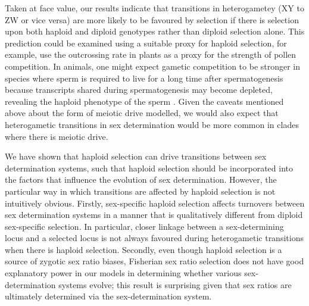 \documentclass[12pt]{article}
\begin{document}
Taken at face value, our results indicate that transitions in heterogametey (XY to ZW or vice versa) are more likely to be favoured by selection if there is selection upon both haploid and diploid genotypes rather than diploid selection alone. 
This prediction could be examined using a suitable proxy for haploid selection, for example, \cite{Lenormand:2005vb} use the outcrossing rate in plants as a proxy for the strength of pollen competition. 
In animals, one might expect gametic competition to be stronger in species where sperm is required to live for a long time after spermatogenesis because transcripts shared during spermatogenesis may become depleted, revealing the haploid phenotype of the sperm \citep{Immler:2014im}. 
Given the caveats mentioned above about the form of meiotic drive modelled, we would also expect that heterogametic transitions in sex determination would be more common in clades where there is meiotic drive. 

We have shown that haploid selection can drive transitions between sex determination systems, such that haploid selection should be incorporated into the factors that influence the evolution of sex determination. 
However, the particular way in which transitions are affected by haploid selection is not intuitively obvious. 
Firstly, sex-specific haploid selection affects turnovers between sex determination systems in a manner that is qualitatively different from diploid sex-specific selection. 
In particular, closer linkage between a sex-determining locus and a selected locus is not always favoured during heterogametic transitions when there is haploid selection. 
Secondly, even though haploid selection is a source of zygotic sex ratio biases, Fisherian sex ratio selection does not have good explanatory power in our models in determining whether various sex-determination systems evolve; this result is surprising given that sex ratios are ultimately determined via the sex-determination system.

\end{document}
